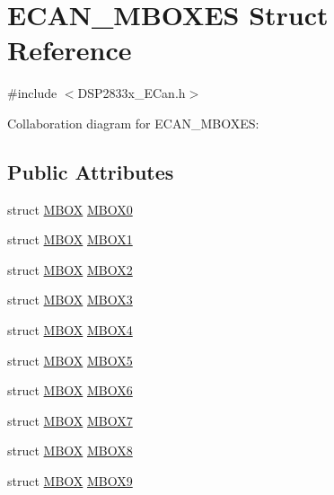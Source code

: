 \hypertarget{struct_e_c_a_n___m_b_o_x_e_s}{}\section{E\+C\+A\+N\+\_\+\+M\+B\+O\+X\+E\+S Struct Reference}
\label{struct_e_c_a_n___m_b_o_x_e_s}


{\ttfamily \#include $<$D\+S\+P2833x\+\_\+\+E\+Can.\+h$>$}



Collaboration diagram for E\+C\+A\+N\+\_\+\+M\+B\+O\+X\+E\+S\+:
\subsection*{Public Attributes}
\begin{DoxyCompactItemize}
\item 
struct \hyperlink{struct_m_b_o_x}{M\+B\+O\+X} \hyperlink{struct_e_c_a_n___m_b_o_x_e_s_a6b60e77519017f63fb9735f37d6e3b75}{M\+B\+O\+X0}
\item 
struct \hyperlink{struct_m_b_o_x}{M\+B\+O\+X} \hyperlink{struct_e_c_a_n___m_b_o_x_e_s_a0c338db17858577d01571e7cb8a3acf8}{M\+B\+O\+X1}
\item 
struct \hyperlink{struct_m_b_o_x}{M\+B\+O\+X} \hyperlink{struct_e_c_a_n___m_b_o_x_e_s_ad5cb7075ac8b691fe6fabc7c79655606}{M\+B\+O\+X2}
\item 
struct \hyperlink{struct_m_b_o_x}{M\+B\+O\+X} \hyperlink{struct_e_c_a_n___m_b_o_x_e_s_ad906b36ea40fce2693c397d2c9f589ea}{M\+B\+O\+X3}
\item 
struct \hyperlink{struct_m_b_o_x}{M\+B\+O\+X} \hyperlink{struct_e_c_a_n___m_b_o_x_e_s_aad4a39e8c0d570db2a2b1ac578155cf0}{M\+B\+O\+X4}
\item 
struct \hyperlink{struct_m_b_o_x}{M\+B\+O\+X} \hyperlink{struct_e_c_a_n___m_b_o_x_e_s_ac7d608c41713f13132c4b764319ebd2c}{M\+B\+O\+X5}
\item 
struct \hyperlink{struct_m_b_o_x}{M\+B\+O\+X} \hyperlink{struct_e_c_a_n___m_b_o_x_e_s_a6aeef71461c5fa5ed5af8d57ef5a2809}{M\+B\+O\+X6}
\item 
struct \hyperlink{struct_m_b_o_x}{M\+B\+O\+X} \hyperlink{struct_e_c_a_n___m_b_o_x_e_s_a3f9574fb73b49b54ba09106e48d34fa7}{M\+B\+O\+X7}
\item 
struct \hyperlink{struct_m_b_o_x}{M\+B\+O\+X} \hyperlink{struct_e_c_a_n___m_b_o_x_e_s_a0a1d70030af8005354d808f5c85864ca}{M\+B\+O\+X8}
\item 
struct \hyperlink{struct_m_b_o_x}{M\+B\+O\+X} \hyperlink{struct_e_c_a_n___m_b_o_x_e_s_ac3c9efea40d4477ad59dc8726a941192}{M\+B\+O\+X9}

\end{DoxyCompactItemize}
